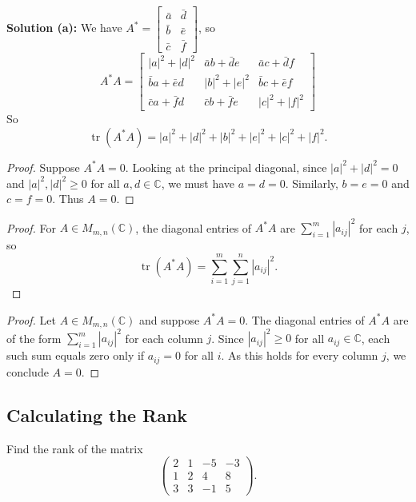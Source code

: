 \textbf{Solution (a):}
We have $A^* = \begin{bmatrix} \bar{a} & \bar{d} \\ \bar{b} & \bar{e} \\ \bar{c} & \bar{f} \end{bmatrix}$, so
\[
A^*A = \begin{bmatrix}
    |a|^2 + |d|^2 & \bar{a}b + \bar{d}e & \bar{a}c + \bar{d}f \\
    \bar{b}a + \bar{e}d & |b|^2 + |e|^2 & \bar{b}c + \bar{e}f \\
    \bar{c}a + \bar{f}d & \bar{c}b + \bar{f}e & |c|^2 + |f|^2
\end{bmatrix}
\]
So
\[\operatorname{tr}(A^*A) = |a|^2 + |d|^2 + |b|^2 + |e|^2 + |c|^2 + |f|^2.\]

\begin{proof}
    Suppose $A^*A = 0$.
    Looking at the principal diagonal, since $|a|^2 + |d|^2 = 0$ and $|a|^2, |d|^2 \geq 0$
    for all $a, d \in \mathbb{C}$, we must have $a = d = 0$.
    Similarly, $b = e = 0$ and $c = f = 0$. Thus $A = 0$.
\end{proof}

\begin{proof}
    For $A \in M_{m,n}(\mathbb{C})$, the diagonal entries of $A^*A$ are $\sum_{i=1}^m |a_{ij}|^2$
    for each $j$, so
    \[\operatorname{tr}(A^*A) = \sum_{i=1}^{m}\sum_{j=1}^{n} |a_{ij}|^2.\]
\end{proof}

\begin{proof}
    Let $A \in M_{m,n}(\mathbb{C})$ and suppose $A^*A = 0$.
    The diagonal entries of $A^*A$ are of the form $\sum_{i=1}^{m} |a_{ij}|^2$ for each column $j$.
    Since $|a_{ij}|^2 \geq 0$ for all $a_{ij} \in \mathbb{C}$, each such sum equals zero only if
    $a_{ij} = 0$ for all $i$.
    As this holds for every column $j$, we conclude $A = 0$.
\end{proof}

\subsection{Calculating the Rank}

\begin{tcolorbox}[title=Exercise 1, breakable]
    Find the rank of the matrix
    \[
    \begin{pmatrix}
        2 & 1 & -5 & -3 \\
        1 & 2 & 4 & 8 \\
        3 & 3 & -1 & 5
    \end{pmatrix}.
    \]
\end{tcolorbox}

